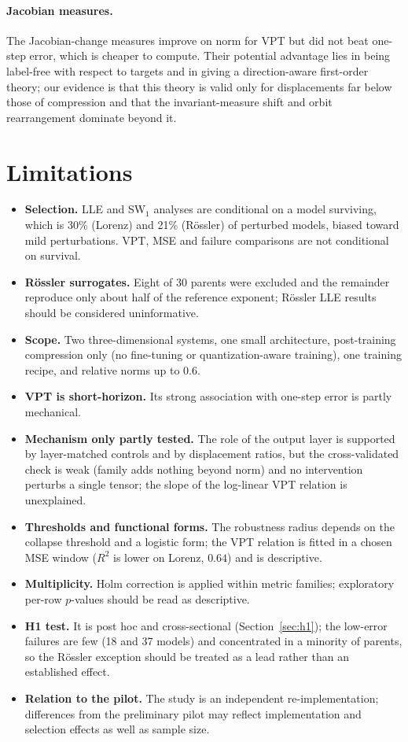 \documentclass[11pt]{article}
\begin{document}
\paragraph{Jacobian measures.} The Jacobian-change measures improve on norm for VPT but did not beat one-step error, which is cheaper to compute. Their potential advantage lies in being label-free with respect to targets and in giving a direction-aware first-order theory; our evidence is that this theory is valid only for displacements far below those of compression and that the invariant-measure shift and orbit rearrangement dominate beyond it.

\section{Limitations}
\begin{itemize}
\item \textbf{Selection.} LLE and SW$_1$ analyses are conditional on a model surviving, which is 30\% (Lorenz) and 21\% (R\"ossler) of perturbed models, biased toward mild perturbations. VPT, MSE and failure comparisons are not conditional on survival.
\item \textbf{R\"ossler surrogates.} Eight of 30 parents were excluded and the remainder reproduce only about half of the reference exponent; R\"ossler LLE results should be considered uninformative.
\item \textbf{Scope.} Two three-dimensional systems, one small architecture, post-training compression only (no fine-tuning or quantization-aware training), one training recipe, and relative norms up to $0.6$.
\item \textbf{VPT is short-horizon.} Its strong association with one-step error is partly mechanical.
\item \textbf{Mechanism only partly tested.} The role of the output layer is supported by layer-matched controls and by displacement ratios, but the cross-validated check is weak (family adds nothing beyond norm) and no intervention perturbs a single tensor; the slope of the log-linear VPT relation is unexplained.
\item \textbf{Thresholds and functional forms.} The robustness radius depends on the collapse threshold and a logistic form; the VPT relation is fitted in a chosen MSE window ($R^2$ is lower on Lorenz, $0.64$) and is descriptive.
\item \textbf{Multiplicity.} Holm correction is applied within metric families; exploratory per-row $p$-values should be read as descriptive.
\item \textbf{H1 test.} It is post hoc and cross-sectional (Section~\ref{sec:h1}); the low-error failures are few (18 and 37 models) and concentrated in a minority of parents, so the R\"ossler exception should be treated as a lead rather than an established effect.
\item \textbf{Relation to the pilot.} The study is an independent re-implementation; differences from the preliminary pilot may reflect implementation and selection effects as well as sample size.
\end{itemize}
\end{document}
